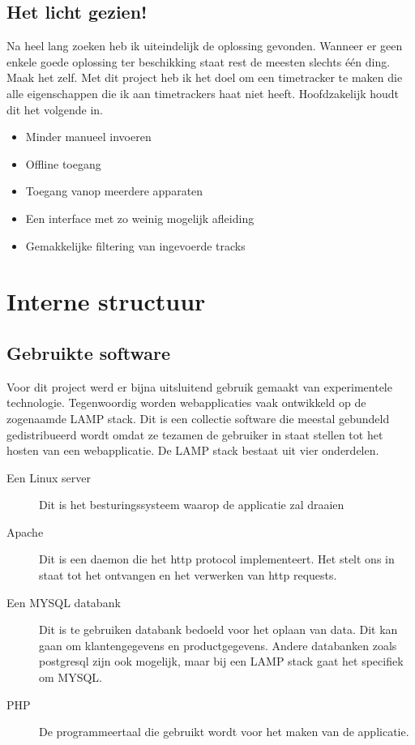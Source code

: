 \documentclass[a4paper,11pt]{article}
\begin{document}
\subsection{Het licht gezien!}
Na heel lang zoeken heb ik uiteindelijk de oplossing gevonden. Wanneer er geen
enkele goede oplossing ter beschikking staat rest de meesten slechts één ding.
Maak het zelf. Met dit project heb ik het doel om een timetracker te maken die
alle eigenschappen die ik aan timetrackers haat niet heeft. Hoofdzakelijk houdt
dit het volgende in.
\begin{itemize}
  \item Minder manueel invoeren
  \item Offline toegang
  \item Toegang vanop meerdere apparaten
  \item Een interface met zo weinig mogelijk afleiding
  \item Gemakkelijke filtering van ingevoerde tracks
\end{itemize}

\section{Interne structuur}

\subsection{Gebruikte software}
Voor dit project werd er bijna uitsluitend gebruik gemaakt van experimentele
technologie. Tegenwoordig worden webapplicaties vaak ontwikkeld op de zogenaamde
LAMP stack. Dit is een collectie software die meestal gebundeld gedistribueerd
wordt omdat ze tezamen de gebruiker in staat stellen tot het hosten van een
webapplicatie. De LAMP stack bestaat uit vier onderdelen.

\begin{description}
\item[Een Linux server] Dit is het besturingssysteem waarop de applicatie zal
draaien
\item[Apache] Dit is een daemon die het http protocol implementeert. Het stelt
ons in staat tot het ontvangen en het verwerken van http requests.
\item[Een MYSQL databank] Dit is te gebruiken databank bedoeld voor het oplaan
van data. Dit kan gaan om klantengegevens en productgegevens. Andere databanken
zoals postgresql zijn ook mogelijk, maar bij een LAMP stack gaat het specifiek
om MYSQL.
\item[PHP] De programmeertaal die gebruikt wordt voor het maken van de
applicatie.
\end{description}
\end{document}
